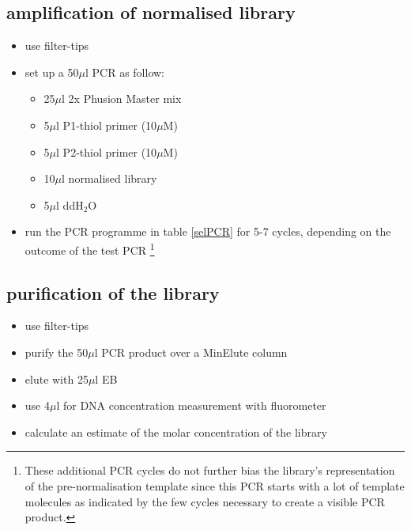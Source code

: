 \subsection
{amplification of normalised library}
\begin{itemize}
\item {\color{red}use filter-tips}
\item set up a 50$\mu$l PCR as follow:
	\begin{itemize}
	\item 25$\mu$l 2x Phusion Master mix
	\item 5$\mu$l P1-thiol primer (10$\mu$M)
	\item 5$\mu$l P2-thiol primer (10$\mu$M)
	\item 10$\mu$l normalised library
	\item 5$\mu$l ddH$_{2}$O
	\end{itemize}
\item run the PCR programme in table \ref{selPCR} for 5-7 cycles, depending on the outcome of the test PCR \footnote{These additional PCR cycles do not further bias the library's representation of the pre-normalisation template since this PCR starts with a lot of template molecules as indicated by the few cycles necessary to create a visible PCR product.}
\end{itemize}

\subsection
{purification of the library}
\begin{itemize}
\item {\color{red}use filter-tips}
\item purify the 50$\mu$l PCR product over a MinElute column
\item elute with 25$\mu$l EB
\item use 4$\mu$l for DNA concentration measurement with fluorometer
\item calculate an estimate of the molar concentration of the library
\end{itemize}


